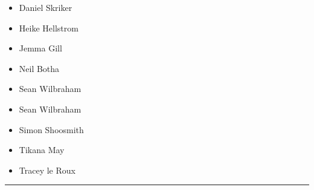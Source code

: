 \documentclass[10pt]{article}
\begin{document}
		

	\begin{multicols}{2}

		\begin{itemize}
									\item Daniel Skriker
									\item Heike Hellstrom
									\item Jemma Gill
									\item Neil Botha
									\item Sean Wilbraham
						\end{itemize}

		\vfill\null
		\columnbreak

		\begin{itemize}
									\item Sean Wilbraham
									\item Simon Shoosmith
									\item Tikana May
									\item Tracey le Roux
						\end{itemize}

		\vfill\null

		\end{multicols}



			\vspace{0.5cm}
	\hrule
	\vspace{0.5cm}
\end{document}
